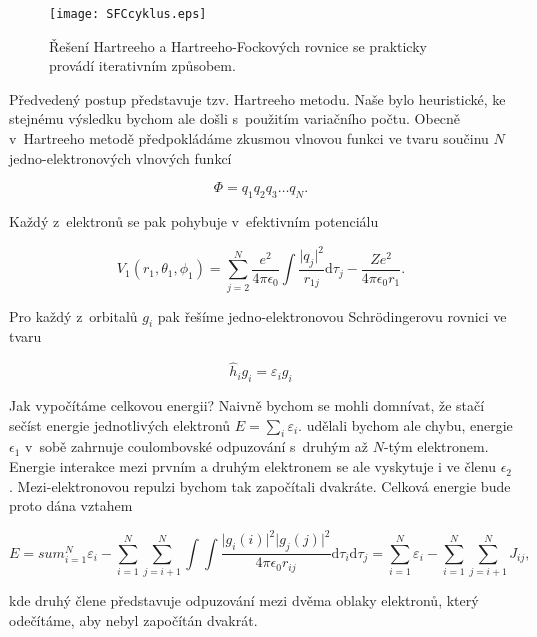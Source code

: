 \begin{figure} [ht]
\centering
\texttt{[image: SFCcyklus.eps]}
\caption[SCF kolečko]{Řešení Hartreeho a Hartreeho-Fockových rovnice se prakticky provádí iterativním způsobem.}
\label{obr:SCFcycle}
\end{figure}
  
Předvedený postup představuje tzv. Hartreeho metodu. Naše  bylo heuristické, ke stejnému výsledku bychom ale došli s~použitím variačního počtu. Obecně v~Hartreeho metodě předpokládáme zkusmou vlnovou funkci ve tvaru součinu $N$ jedno-elektronových vlnových funkcí

\begin{equation}
\Phi = q_1 q_2 q_3 \dots q_N.
\label{rov:VE-44}
\end{equation}

\noindent Každý z~elektronů se pak pohybuje v~efektivním potenciálu

\begin{equation}
V_1 (r_1, \theta_1,\phi_1) = \sum_{j=2}^N \frac{e^2}{4 \pi \epsilon_0} \int \frac{\vert q_j \vert^2}{r_{1j}} \mathrm{d}\tau_j - \frac{Z e^2}{4 \pi \epsilon_0 r_1}.
\label{rov:VE-45}
\end{equation}

\noindent Pro každý z~orbitalů $g_i$ pak řešíme jedno-elektronovou Schr\"odingerovu rovnici ve tvaru

\begin{equation}
\hat{h}_i g_i = \varepsilon_i g_i
\label{rov:VE-46}
\end{equation}

Jak vypočítáme celkovou energii? Naivně bychom se mohli domnívat, že stačí sečíst energie jednotlivých elektronů $E = \sum_i \varepsilon_i$. udělali bychom ale chybu, energie $\epsilon_1$ v~sobě zahrnuje coulombovské odpuzování s~druhým až $N$-tým elektronem. Energie interakce mezi prvním a druhým elektronem se ale vyskytuje i ve členu $\epsilon_2$. Mezi-elektronovou repulzi bychom tak započítali dvakráte. Celková energie bude proto dána vztahem

\begin{equation}
E = sum_{i=1}^N \varepsilon_i - \sum_{i=1}^N \sum_{j=i+1}^N \int \int \frac{\vert g_i(i) \vert^2 \vert g_j(j)\vert^2}{4 \pi \epsilon_0 r_{ij}} \mathrm{d}\tau_i \mathrm{d}\tau_j = \sum_{i=1}^N \varepsilon_i - \sum_{i=1}^N \sum_{j=i+1}^N J_{ij},
\label{rov:VE-47}
\end{equation}

\noindent kde druhý člene představuje odpuzování mezi dvěma oblaky elektronů, který odečítáme, aby nebyl započítán dvakrát.


